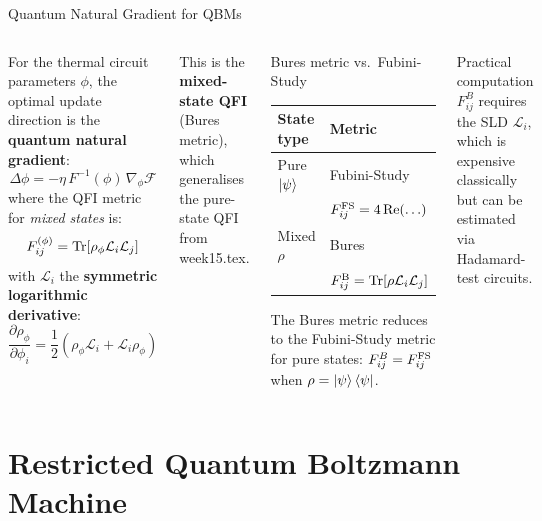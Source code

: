 \documentclass[aspectratio=169,10pt]{beamer}
\begin{document}
\begin{frame}{Quantum Natural Gradient for QBMs}
  \begin{columns}[T]
      For the thermal circuit parameters $\phi$, the optimal
      update direction is the \textbf{quantum natural gradient}:
      \[
        \Delta\phi = -\eta\,F^{-1}(\phi)\,\nabla_\phi\mathcal{F}
      \]
      where the QFI metric for \emph{mixed states} is:
      \[
        F_{ij}^{(\phi)}
        = \Tr\!\left[\rho_\phi \mathcal{L}_i\mathcal{L}_j\right]
      \]
      with $\mathcal{L}_i$ the \textbf{symmetric logarithmic derivative}:
      \[
        \frac{\partial\rho_\phi}{\partial\phi_i}
        = \frac{1}{2}(\rho_\phi\mathcal{L}_i + \mathcal{L}_i\rho_\phi)
      \]

      This is the \textbf{mixed-state QFI} (Bures metric), which
      generalises the pure-state QFI from week15.tex.
      \begin{block}{Bures metric vs.\ Fubini-Study}
        \begin{tabular}{ll}
          \toprule
          State type & Metric \\
          \midrule
          Pure $\ket{\psi}$ & Fubini-Study \\
                            & $F_{ij}^{\rm FS} = 4\,\mathrm{Re}(\ldots)$ \\
          Mixed $\rho$ & Bures \\
                       & $F_{ij}^{\rm B} = \Tr[\rho\mathcal{L}_i\mathcal{L}_j]$ \\
          \bottomrule
        \end{tabular}
        \vspace{0.2cm}

        The Bures metric reduces to the Fubini-Study metric
        for pure states: $F_{ij}^B = F_{ij}^{\rm FS}$ when
        $\rho = \ket{\psi}\bra{\psi}$.
      \end{block}
      \vspace{0.2cm}
      \begin{alertblock}{Practical computation}
        $F^B_{ij}$ requires the SLD $\mathcal{L}_i$, which is
        expensive classically but can be estimated via
        Hadamard-test circuits.
      \end{alertblock}
  \end{columns}
\end{frame}

\section{Restricted Quantum Boltzmann Machine}
\end{document}

